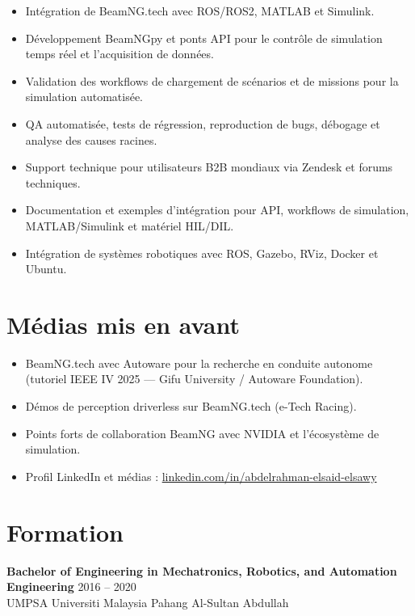 \documentclass[11pt,a4paper]{article}
\begin{document}
\begin{itemize}
    \item Intégration de BeamNG.tech avec ROS/ROS2, MATLAB et Simulink.
    \item Développement BeamNGpy et ponts API pour le contrôle de simulation temps réel et l'acquisition de données.
    \item Validation des workflows de chargement de scénarios et de missions pour la simulation automatisée.
    \item QA automatisée, tests de régression, reproduction de bugs, débogage et analyse des causes racines.
    \item Support technique pour utilisateurs B2B mondiaux via Zendesk et forums techniques.
    \item Documentation et exemples d'intégration pour API, workflows de simulation, MATLAB/Simulink et matériel HIL/DIL.
    \item Intégration de systèmes robotiques avec ROS, Gazebo, RViz, Docker et Ubuntu.
\end{itemize}

\section*{Médias mis en avant}

\begin{itemize}
    \item BeamNG.tech avec Autoware pour la recherche en conduite autonome (tutoriel IEEE IV 2025 — Gifu University / Autoware Foundation).
    \item Démos de perception driverless sur BeamNG.tech (e-Tech Racing).
    \item Points forts de collaboration BeamNG avec NVIDIA et l'écosystème de simulation.
    \item Profil LinkedIn et médias : \href{https://www.linkedin.com/in/abdelrahman-elsaid-elsawy}{linkedin.com/in/abdelrahman-elsaid-elsawy}
\end{itemize}

\section*{Formation}

\textbf{\color{PrimaryColor}Bachelor of Engineering in Mechatronics, Robotics, and Automation Engineering}
\hfill 2016 -- 2020\\
UMPSA Universiti Malaysia Pahang Al-Sultan Abdullah
\end{document}
